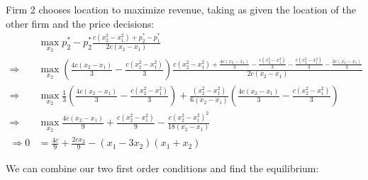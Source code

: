 \documentclass[11pt]{article} %
\begin{document}
Firm 2 chooses location to maximize revenue, taking as given the location of the other firm and the price decisions:
\begin{align*}
&\max_{x_2}  p_2^{*}-p_2^{*}\frac{c(x_2^2 - x_1^2) + p_2^{*} - p_1^{*}}{2c(x_2 - x_1)}\\
\Rightarrow&\max_{x_2}  \left(\frac{4c(x_2 - x_1)}{3} - \frac{c(x_2^2 - x_1^2)}{3}\right)\frac{c(x_2^2 - x_1^2) +  \frac{4c(x_2 - x_1)}{3} - \frac{c(x_2^2 - x_1^2)}{3} - \frac{c(x_2^2 - x_1^2)}{3} - \frac{2c(x_2 - x_1)}{3}}{2c(x_2 - x_1)}\\
\Rightarrow&\max_{x_2}  \frac{1}{3}\left(\frac{4c(x_2 - x_1)}{3} - \frac{c(x_2^2 - x_1^2)}{3}\right) + \frac{(x_2^2 - x_1^2)}{6(x_2 - x_1)}\left(\frac{4c(x_2 - x_1)}{3} - \frac{c(x_2^2 - x_1^2)}{3}\right)\\
\Rightarrow&\max_{x_2} \frac{4c(x_2 - x_1)}{9} + \frac{c(x_2^2 - x_1^2)}{9} - \frac{c(x_2^2 - x_1^2)^2}{18(x_2 - x_1)}\\
\Rightarrow 0&=\frac{4c}{9} + \frac{2cx_2}{9} - (x_1-3x_2)(x_1+x_2)
\end{align*}

We can combine our two first order conditions and find the equilibrium:
\end{document}
